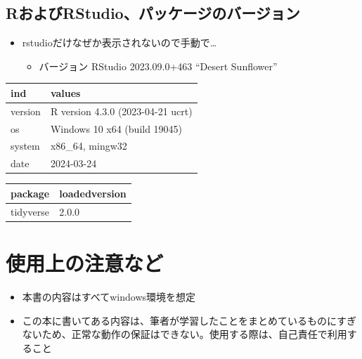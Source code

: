 \documentclass[
  b5paper,
  xelatex, ja=standard]{bxjsbook}
\providecommand{\tightlist}{%
  \setlength{\itemsep}{0pt}\setlength{\parskip}{0pt}}\usepackage{longtable,booktabs,array}
\begin{document}
\subsection*{RおよびRStudio、パッケージのバージョン}\label{rux304aux3088ux3073rstudioux30d1ux30c3ux30b1ux30fcux30b8ux306eux30d0ux30fcux30b8ux30e7ux30f3}

\begin{itemize}
\tightlist
\item
  rstudioだけなぜか表示されないので手動で\ldots{}

  \begin{itemize}
  \tightlist
  \item
    バージョン RStudio 2023.09.0+463 ``Desert Sunflower''
  \end{itemize}
\end{itemize}

\begin{table}
\centering
\begin{tabular}{l|l}
\hline
ind & values\\
\hline
version & R version 4.3.0 (2023-04-21 ucrt)\\
\hline
os & Windows 10 x64 (build 19045)\\
\hline
system & x86\_64, mingw32\\
\hline
date & 2024-03-24\\
\hline
\end{tabular}
\end{table}

\begin{table}
\centering
\begin{tabular}{l|l}
\hline
package & loadedversion\\
\hline
tidyverse & 2.0.0\\
\hline
\end{tabular}
\end{table}

\section*{使用上の注意など}\label{ux4f7fux7528ux4e0aux306eux6ce8ux610fux306aux3069}


\begin{itemize}
\item
  本書の内容はすべてwindows環境を想定
\item
  この本に書いてある内容は、筆者が学習したことをまとめているものにすぎないため、正常な動作の保証はできない。使用する際は、自己責任で利用すること
\end{itemize}
\end{document}
